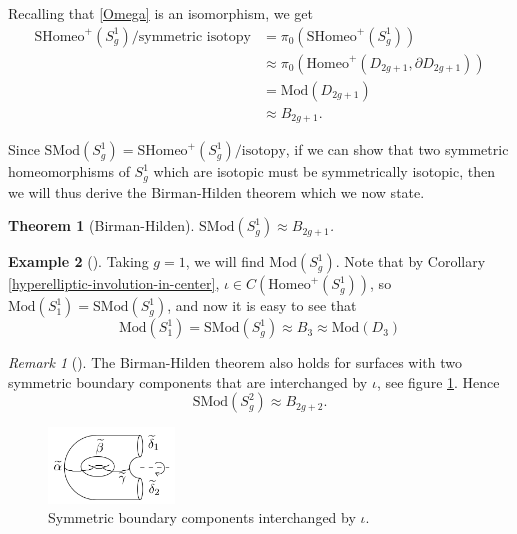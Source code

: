 \documentclass[reqno]{amsart}
\newtheorem{theorem}{Theorem}[section]
\theoremstyle{definition}
\newtheorem{example}[theorem]{Example}
\theoremstyle{remark}
\newtheorem*{remark}{Remark}
\newcommand{\Mod}{{\mathrm{Mod}}}
\newcommand{\SMod}{{\mathrm{SMod}}}
\newcommand{\Homeo}{{\mathrm{Homeo}}}
\newcommand{\SHomeo}{{\mathrm{SHomeo}}}
\begin{document}
   Recalling that \eqref{Omega} is an isomorphism, we
   get
   \begin{align*}
       \SHomeo^{+} \left( S_g^{1} \right) /
       \text{symmetric isotopy}
       &= \pi_0 \left( \SHomeo^{+}(S_g^{1}) \right) \\
       &\approx \pi_0 \left( \Homeo^{+} \left( 
       D_{2g+1}, \partial D_{2g+1} \right)  \right) \\
       &= \Mod \left( D_{2g+1} \right) \\
       &\approx B_{2g+1}.
   \end{align*}
   
   Since
   $\SMod \left( S_g^{1} \right) 
   = \SHomeo^{+} \left( S_g^{1} \right) 
   / \text{isotopy}$,
   if we can show that 
   two symmetric homeomorphisms of $S_{g}^{1}$ which are
   isotopic must be symmetrically isotopic, then
   we will thus derive the Birman-Hilden theorem which we now state.

   \begin{theorem}[Birman-Hilden]
       $\SMod \left( S_g^{1} \right) \approx
       B_{2g+1}$.
   \end{theorem}


   \begin{example}[]
       Taking $g=1$, we will find
       $\Mod \left( S_g^{1} \right) $.
       Note that by Corollary
       \ref{hyperelliptic-involution-in-center},
       $\iota \in C\left( 
       \Homeo^{+}\left( S_g^{1} \right)  \right)  $, so
       $\Mod \left( S_1^{1} \right) =
       \SMod\left( S_g^{1} \right) $, and now it is
       easy to see that
       \[
       \Mod \left( S_1^{1} \right) = \SMod \left( S_g^{1} \right) 
       \approx B_{3} \approx \Mod \left( D_3 \right) 
       \] 
   \end{example}

   \begin{remark}[]
       The Birman-Hilden theorem also holds for
       surfaces with two symmetric boundary
       components that are interchanged by
       $\iota$, see figure
       \ref{fig:-Birman-Hilden-two-symmetric-boundary-components-png}.
       Hence
       \[
       \SMod \left( S_g^{2} \right) 
       \approx B_{2g+2}.
       \] 

        \begin{figure}[htpb]
           \centering
           \includegraphics[width=0.3\textwidth]{
           Birman-Hilden-two-symmetric-boundary-components.png}
           \caption{Symmetric boundary components
           interchanged by $\iota$.}
           \label{fig:-Birman-Hilden-two-symmetric-boundary-components-png}
       \end{figure}
   \end{remark}
\end{document}
